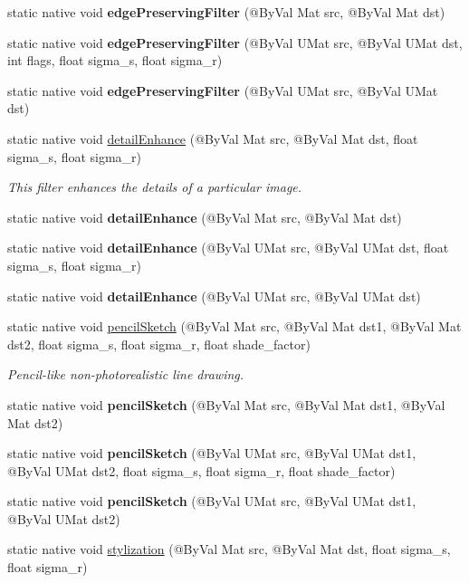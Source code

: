 \begin{DoxyCompactItemize}
\item 
static native void {\bfseries edge\+Preserving\+Filter} (@By\+Val Mat src, @By\+Val Mat dst)
\item 
static native void {\bfseries edge\+Preserving\+Filter} (@By\+Val U\+Mat src, @By\+Val U\+Mat dst, int flags, float sigma\+\_\+s, float sigma\+\_\+r)
\item 
static native void {\bfseries edge\+Preserving\+Filter} (@By\+Val U\+Mat src, @By\+Val U\+Mat dst)
\item 
static native void \hyperlink{group__photo__render_ga136c4678616b50ca67bb53ea951385fe}{detail\+Enhance} (@By\+Val Mat src, @By\+Val Mat dst, float sigma\+\_\+s, float sigma\+\_\+r)
\begin{DoxyCompactList}\small\item\em This filter enhances the details of a particular image. \end{DoxyCompactList}\item 
static native void {\bfseries detail\+Enhance} (@By\+Val Mat src, @By\+Val Mat dst)
\item 
static native void {\bfseries detail\+Enhance} (@By\+Val U\+Mat src, @By\+Val U\+Mat dst, float sigma\+\_\+s, float sigma\+\_\+r)
\item 
static native void {\bfseries detail\+Enhance} (@By\+Val U\+Mat src, @By\+Val U\+Mat dst)
\item 
static native void \hyperlink{group__photo__render_gafec8b96cb1b707bb2a5b2b2d3957f92d}{pencil\+Sketch} (@By\+Val Mat src, @By\+Val Mat dst1, @By\+Val Mat dst2, float sigma\+\_\+s, float sigma\+\_\+r, float shade\+\_\+factor)
\begin{DoxyCompactList}\small\item\em Pencil-\/like non-\/photorealistic line drawing. \end{DoxyCompactList}\item 
static native void {\bfseries pencil\+Sketch} (@By\+Val Mat src, @By\+Val Mat dst1, @By\+Val Mat dst2)
\item 
static native void {\bfseries pencil\+Sketch} (@By\+Val U\+Mat src, @By\+Val U\+Mat dst1, @By\+Val U\+Mat dst2, float sigma\+\_\+s, float sigma\+\_\+r, float shade\+\_\+factor)
\item 
static native void {\bfseries pencil\+Sketch} (@By\+Val U\+Mat src, @By\+Val U\+Mat dst1, @By\+Val U\+Mat dst2)
\item 
static native void \hyperlink{group__photo__render_ga2dc38eeaea6cfc1c83ed2bcc4236a830}{stylization} (@By\+Val Mat src, @By\+Val Mat dst, float sigma\+\_\+s, float sigma\+\_\+r)

\end{DoxyCompactItemize}
